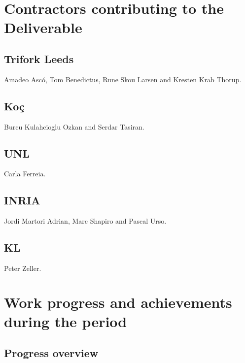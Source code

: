 \documentclass[12pt,twoside]{article}
\begin{document}
\section{Contractors contributing to the Deliverable}

\subsection{Trifork Leeds}
Amadeo Asc\'{o}, Tom Benedictus, Rune Skou Larsen and Kresten Krab Thorup.


\subsection{Ko\c{c}}
Burcu Kulahcioglu Ozkan and Serdar Tasiran.


\subsection{UNL}
Carla Ferreia.


\subsection{INRIA}
Jordi Martori Adrian, Marc Shapiro and Pascal Urso.


\subsection{KL}
Peter Zeller.


\newpage
\section{Work progress and achievements during the period} \label{s:DX-}

\subsection{Progress overview}

\end{document}

